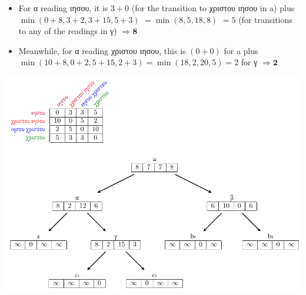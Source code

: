 \documentclass[10pt]{beamer}
\begin{document}
	\begin{frame}
		\begin{itemize}
			\item For {\renewfontfamily{}\textgreek{α}} reading \textgreek{ιησου}, it is $3+0$ (for the transition to \textgreek{χριστου ιησου} in {\setmainfont{EB Garamond}a}) plus $\min(0+8, 3+2, 3+15, 5+3)$ $= \min(8, 5, 18, 8)$ $= 5$ (for transitions to any of the readings in {\renewfontfamily{}\textgreek{γ}}) $\Rightarrow \mathbf{8}$
			\item Meanwhile, for {\renewfontfamily{}\textgreek{α}} reading \textgreek{χριστου ιησου}, this is $(0+0)$ for  {\setmainfont{EB Garamond}a} plus $\min(10+8, 0+2, 5+15, 2+3) = \min(18,2,20,5) = 2$ for {\renewfontfamily{}\textgreek{γ}} $\Rightarrow \mathbf{2}$
		\end{itemize}
		\begin{center}
			\includegraphics[scale=0.5]{../img/gene-tree-unrooted-sankoff.pdf}
		\end{center}
	\end{frame}
\end{document}
